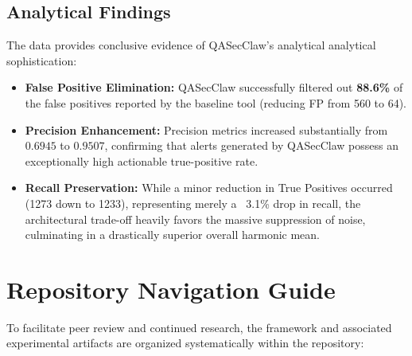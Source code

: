 \documentclass[11pt,a4paper]{article}
\begin{document}
\subsection{Analytical Findings}
The data provides conclusive evidence of QASecClaw's analytical analytical sophistication:
\begin{itemize}
    \item \textbf{False Positive Elimination:} QASecClaw successfully filtered out \textbf{88.6\%} of the false positives reported by the baseline tool (reducing FP from 560 to 64).
    \item \textbf{Precision Enhancement:} Precision metrics increased substantially from $0.6945$ to $0.9507$, confirming that alerts generated by QASecClaw possess an exceptionally high actionable true-positive rate.
    \item \textbf{Recall Preservation:} While a minor reduction in True Positives occurred (1273 down to 1233), representing merely a ~3.1\% drop in recall, the architectural trade-off heavily favors the massive suppression of noise, culminating in a drastically superior overall harmonic mean.
\end{itemize}

\section{Repository Navigation Guide}
To facilitate peer review and continued research, the framework and associated experimental artifacts are organized systematically within the repository:

\vspace{0.3cm}
\end{document}
